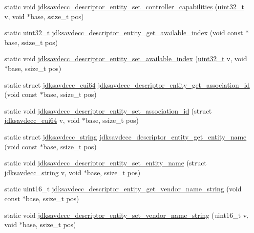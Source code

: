 \begin{DoxyCompactItemize}
\item 
static void \hyperlink{group__descriptor__entity_ga1a2d2134abe752eeedadf7ca4294ade9}{jdksavdecc\+\_\+descriptor\+\_\+entity\+\_\+set\+\_\+controller\+\_\+capabilities} (\hyperlink{parse_8c_a6eb1e68cc391dd753bc8ce896dbb8315}{uint32\+\_\+t} v, void $\ast$base, ssize\+\_\+t pos)
\item 
static \hyperlink{parse_8c_a6eb1e68cc391dd753bc8ce896dbb8315}{uint32\+\_\+t} \hyperlink{group__descriptor__entity_gaf5a970ec284e76b45d98797daacc2948}{jdksavdecc\+\_\+descriptor\+\_\+entity\+\_\+get\+\_\+available\+\_\+index} (void const $\ast$base, ssize\+\_\+t pos)
\item 
static void \hyperlink{group__descriptor__entity_ga9cfc451c1a0984963caf97163e2370aa}{jdksavdecc\+\_\+descriptor\+\_\+entity\+\_\+set\+\_\+available\+\_\+index} (\hyperlink{parse_8c_a6eb1e68cc391dd753bc8ce896dbb8315}{uint32\+\_\+t} v, void $\ast$base, ssize\+\_\+t pos)
\item 
static struct \hyperlink{structjdksavdecc__eui64}{jdksavdecc\+\_\+eui64} \hyperlink{group__descriptor__entity_gac34011786f9cc4d91f3a67f350d488c1}{jdksavdecc\+\_\+descriptor\+\_\+entity\+\_\+get\+\_\+association\+\_\+id} (void const $\ast$base, ssize\+\_\+t pos)
\item 
static void \hyperlink{group__descriptor__entity_gacba8244a6fdae652303a4adb6221d63a}{jdksavdecc\+\_\+descriptor\+\_\+entity\+\_\+set\+\_\+association\+\_\+id} (struct \hyperlink{structjdksavdecc__eui64}{jdksavdecc\+\_\+eui64} v, void $\ast$base, ssize\+\_\+t pos)
\item 
static struct \hyperlink{structjdksavdecc__string}{jdksavdecc\+\_\+string} \hyperlink{group__descriptor__entity_ga6989438f225ed096ba558bf0f56e571f}{jdksavdecc\+\_\+descriptor\+\_\+entity\+\_\+get\+\_\+entity\+\_\+name} (void const $\ast$base, ssize\+\_\+t pos)
\item 
static void \hyperlink{group__descriptor__entity_gad94296ee558e018c5854af962b30b4a5}{jdksavdecc\+\_\+descriptor\+\_\+entity\+\_\+set\+\_\+entity\+\_\+name} (struct \hyperlink{structjdksavdecc__string}{jdksavdecc\+\_\+string} v, void $\ast$base, ssize\+\_\+t pos)
\item 
static uint16\+\_\+t \hyperlink{group__descriptor__entity_ga397d7c53568d8b606ba5342461faa252}{jdksavdecc\+\_\+descriptor\+\_\+entity\+\_\+get\+\_\+vendor\+\_\+name\+\_\+string} (void const $\ast$base, ssize\+\_\+t pos)
\item 
static void \hyperlink{group__descriptor__entity_ga33e995f481c1205994c92fd4d6d6f26e}{jdksavdecc\+\_\+descriptor\+\_\+entity\+\_\+set\+\_\+vendor\+\_\+name\+\_\+string} (uint16\+\_\+t v, void $\ast$base, ssize\+\_\+t pos)

\end{DoxyCompactItemize}
